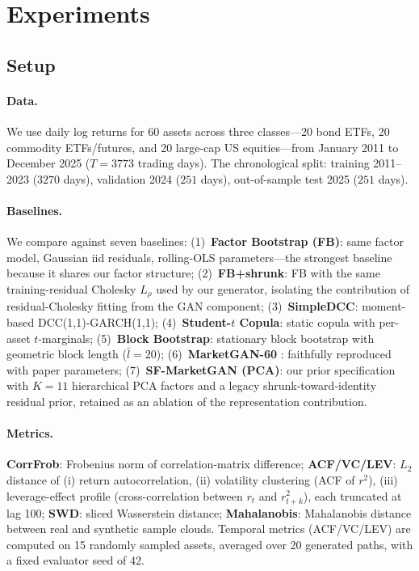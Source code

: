 \section{Experiments}
\label{sec:experiments}

\subsection{Setup}
\label{sec:setup}

\paragraph{Data.}
We use daily log returns for 60 assets across three classes---20 bond ETFs, 20 commodity ETFs/futures, and 20 large-cap US equities---from January 2011 to December 2025 ($T=3773$ trading days). The chronological split: training 2011--2023 ($3270$ days), validation 2024 ($251$ days), out-of-sample test 2025 ($251$ days).

\paragraph{Baselines.}
We compare against seven baselines:
(1)~\textbf{Factor Bootstrap (FB)}: same factor model, Gaussian iid residuals, rolling-OLS parameters---the strongest baseline because it shares our factor structure;
(2)~\textbf{FB+shrunk}: FB with the same training-residual Cholesky $L_\rho$ used by our generator, isolating the contribution of residual-Cholesky fitting from the GAN component;
(3)~\textbf{SimpleDCC}: moment-based DCC(1,1)-GARCH(1,1);
(4)~\textbf{Student-$t$ Copula}: static copula with per-asset $t$-marginals;
(5)~\textbf{Block Bootstrap}: stationary block bootstrap with geometric block length ($\bar{l}=20$);
(6)~\textbf{MarketGAN-60} \citep{huh2026marketgans}: faithfully reproduced with paper parameters;
(7)~\textbf{SF-MarketGAN (PCA)}: our prior specification with $K=11$ hierarchical PCA factors and a legacy shrunk-toward-identity residual prior, retained as an ablation of the representation contribution.

\paragraph{Metrics.}
\textbf{CorrFrob}: Frobenius norm of correlation-matrix difference;
\textbf{ACF/VC/LEV}: $L_2$ distance of (i) return autocorrelation, (ii) volatility clustering (ACF of $r^2$), (iii) leverage-effect profile (cross-correlation between $r_t$ and $r^2_{t+k}$), each truncated at lag 100;
\textbf{SWD}: sliced Wasserstein distance;
\textbf{Mahalanobis}: Mahalanobis distance between real and synthetic sample clouds.
Temporal metrics (ACF/VC/LEV) are computed on 15 randomly sampled assets, averaged over 20 generated paths, with a fixed evaluator seed of 42.

